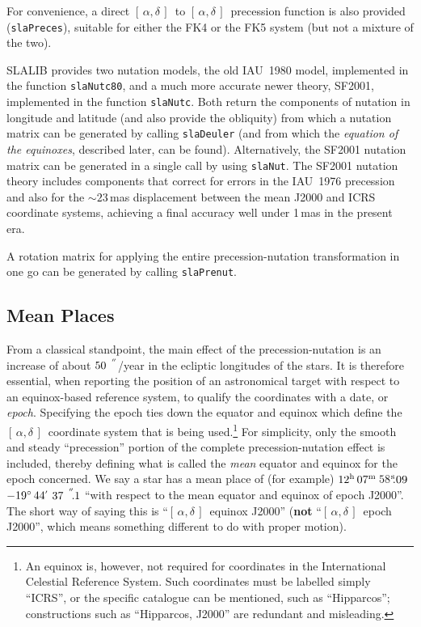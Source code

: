 \documentclass[11pt,fleqn,twoside]{article}
\renewcommand{\_}{{\tt\char'137}}     %
\newcommand{\radec}     {$[\,\alpha,\delta\,]$}
\newcommand{\arcseci}[1] {$#1\hspace{0.05em}$\raisebox{-0.5ex}
                         {$^{'\hspace{-0.1em}'\hspace{0.0em}}$}}
\newcommand{\arcsec}[2] {\arcseci{#1}$\hspace{-0.35em}.#2$}
\newcommand{\dms}[4]    {$#1^{\circ}\,#2\raisebox{-0.5ex}
                        {$^{'}$}\,$\arcsec{#3}{#4}}
\newcommand{\tseci}[1]   {$#1$\mbox{$^{\rm s}$}}
\newcommand{\tsec}[2]    {\tseci{#1}$\hspace{-0.3em}.#2$}
\newcommand{\hms}[4]    {$#1^{\rm h}\,#2^{\rm m}\,$\tsec{#3}{#4}}
\begin{document}
For convenience, a direct \radec\ to \radec\ precession function is
also provided
({\tt slaPreces}),
suitable for either the FK4 or the FK5 system (but not a
mixture of the two).

SLALIB provides two nutation models, the old IAU~1980 model,
implemented in the function
{\tt slaNutc80}, and a much more accurate newer theory, SF2001,
implemented in the function
{\tt slaNutc}.
Both return the components of nutation
in longitude and latitude (and also provide the obliquity) from
which a nutation matrix can be generated by calling
{\tt slaDeuler}
(and from which the {\it equation of the equinoxes}, described
later, can be found).  Alternatively,
the SF2001 nutation matrix can be generated in a single call by using
{\tt slaNut}.  The SF2001 nutation theory includes components that correct
for errors in the IAU~1976 precession and also for the
$\sim 23\,$mas
displacement between the mean J2000 and ICRS coordinate systems,
achieving a final accuracy well under 1\,mas in the present era.
 
A rotation matrix for applying the entire precession-nutation
transformation in one go can be generated by calling
{\tt slaPrenut}.

\subsection{Mean Places}
From a classical standpoint,
the main effect of the precession-nutation is an increase of about
\arcseci{50}/year in the ecliptic longitudes of the stars.  It is therefore
essential, when reporting the position of an astronomical target with
respect to an equinox-based reference system, to
qualify the coordinates with a date, or {\it epoch}.
Specifying the epoch ties down the equator and
equinox which define the \radec\ coordinate system that is
being used.\footnote{An equinox is,
however, not required for coordinates
in the International Celestial Reference System.  Such coordinates must
be labelled simply ``ICRS'', or the specific catalogue can be mentioned,
such as ``Hipparcos'';  constructions such as ``Hipparcos, J2000'' are
redundant and misleading.}  For simplicity, only
the smooth and steady ``precession''
portion of the complete precession-nutation effect is
included, thereby defining what is called the {\it mean}\/
equator and equinox for the epoch concerned.  We say a star
has a mean place of (for example)
\hms{12}{07}{58}{09}~\dms{-19}{44}{37}{1} ``with respect to the mean equator
and equinox of epoch J2000''.  The short way of saying
this is ``\radec\ equinox J2000'' ({\bf not} ``\radec\ epoch J2000'',
which means something different to do with
proper motion).
\end{document}
